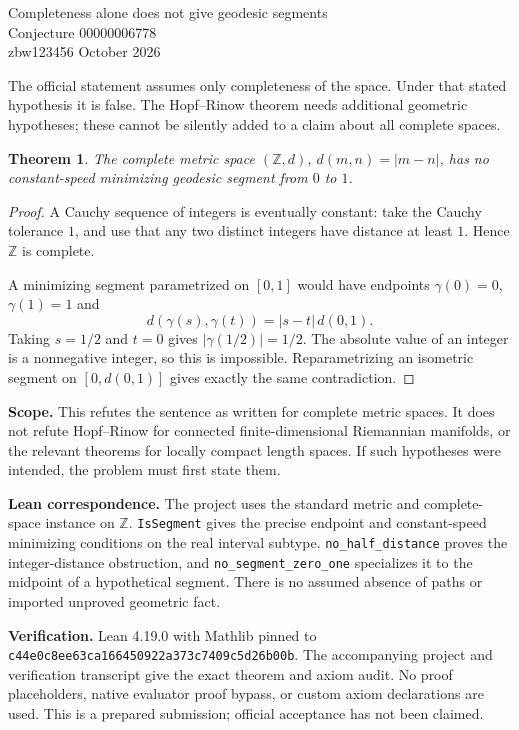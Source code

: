 \documentclass[11pt]{article}
\newtheorem{theorem}{Theorem}
\begin{document}
\begin{center}{\Large Completeness alone does not give geodesic segments}\\[5pt]{\large Conjecture 00000006778}\\[5pt]zbw123456  October 2026\end{center}

The official statement assumes only completeness of the space. Under that stated hypothesis it is false. The Hopf--Rinow theorem needs additional geometric hypotheses; these cannot be silently added to a claim about all complete spaces.
\begin{theorem}
The complete metric space $(\mathbb Z,d)$, $d(m,n)=|m-n|$, has no constant-speed minimizing geodesic segment from $0$ to $1$.
\end{theorem}
\begin{proof}
A Cauchy sequence of integers is eventually constant: take the Cauchy tolerance $1$, and use that any two distinct integers have distance at least $1$. Hence $\mathbb Z$ is complete.

A minimizing segment parametrized on $[0,1]$ would have endpoints $\gamma(0)=0$, $\gamma(1)=1$ and
\[
d(\gamma(s),\gamma(t))=|s-t|\,d(0,1).
\]
Taking $s=1/2$ and $t=0$ gives $|\gamma(1/2)|=1/2$. The absolute value of an integer is a nonnegative integer, so this is impossible. Reparametrizing an isometric segment on $[0,d(0,1)]$ gives exactly the same contradiction.
\end{proof}
\textbf{Scope.} This refutes the sentence as written for complete metric spaces. It does not refute Hopf--Rinow for connected finite-dimensional Riemannian manifolds, or the relevant theorems for locally compact length spaces. If such hypotheses were intended, the problem must first state them.

\textbf{Lean correspondence.} The project uses the standard metric and complete-space instance on $\mathbb Z$. \texttt{IsSegment} gives the precise endpoint and constant-speed minimizing conditions on the real interval subtype. \texttt{no\_half\_distance} proves the integer-distance obstruction, and \texttt{no\_segment\_zero\_one} specializes it to the midpoint of a hypothetical segment. There is no assumed absence of paths or imported unproved geometric fact.


\textbf{Verification.} Lean 4.19.0 with Mathlib pinned to
\texttt{c44e0c8ee63ca166450922a373c7409c5d26b00b}.
The accompanying project and verification transcript give the exact theorem and axiom audit. No proof placeholders, native evaluator proof bypass, or custom axiom declarations are used. This is a prepared submission; official acceptance has not been claimed.
\end{document}
